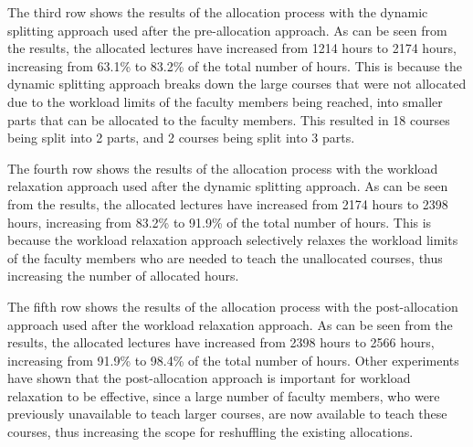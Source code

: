 The third row shows the results of the allocation process with the dynamic splitting approach used after the pre-allocation approach. As can be seen from the results, the allocated lectures have increased from 1214 hours to 2174 hours, increasing from 63.1\% to 83.2\% of the total number of hours. This is because the dynamic splitting approach breaks down the large courses that were not allocated due to the workload limits of the faculty members being reached, into smaller parts that can be allocated to the faculty members. This resulted in 18 courses being split into 2 parts, and 2 courses being split into 3 parts.

The fourth row shows the results of the allocation process with the workload relaxation approach used after the dynamic splitting approach. As can be seen from the results, the allocated lectures have increased from 2174 hours to 2398 hours, increasing from 83.2\% to 91.9\% of the total number of hours. This is because the workload relaxation approach selectively relaxes the workload limits of the faculty members who are needed to teach the unallocated courses, thus increasing the number of allocated hours.

The fifth row shows the results of the allocation process with the post-allocation approach used after the workload relaxation approach. As can be seen from the results, the allocated lectures have increased from 2398 hours to 2566 hours, increasing from 91.9\% to 98.4\% of the total number of hours. Other experiments have shown that the post-allocation approach is important for workload relaxation to be effective, since a large number of faculty members, who were previously unavailable to teach larger courses, are now available to teach these courses, thus increasing the scope for reshuffling the existing allocations.

